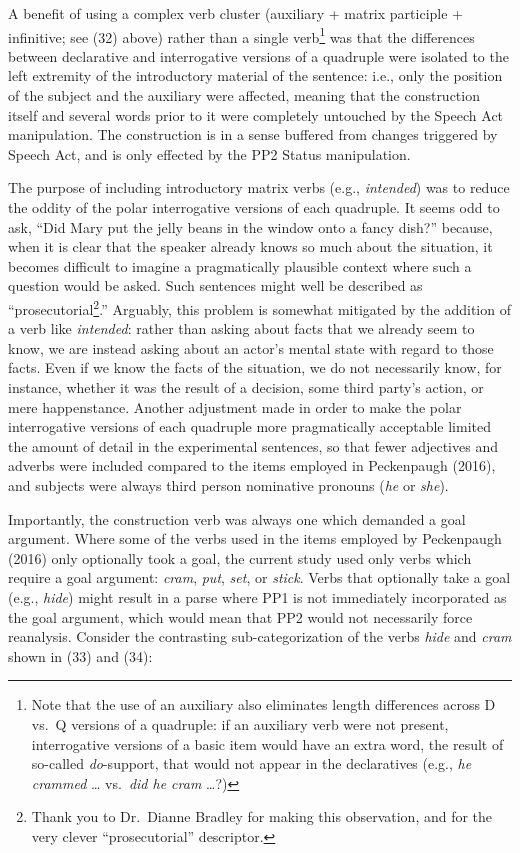 \documentclass[11pt,oneside]{book}
\let\rmarkdownfootnote\footnote%
\def\footnote{\protect\rmarkdownfootnote}
\begin{document}
A benefit of using a complex verb cluster (auxiliary + matrix participle + infinitive; see (32) above) rather than a single verb\footnote{Note that the use of an auxiliary also eliminates length differences across D vs.~Q versions of a quadruple: if an auxiliary verb were not present, interrogative versions of a basic item would have an extra word, the result of so-called \emph{do}-support, that would not appear in the declaratives (e.g., \emph{he crammed} \ldots{} vs.~\emph{did he cram} \ldots?)} was that the differences between declarative and interrogative versions of a quadruple were isolated to the left extremity of the introductory material of the sentence: i.e., only the position of the subject and the auxiliary were affected, meaning that the construction itself and several words prior to it were completely untouched by the Speech Act manipulation. The construction is in a sense buffered from changes triggered by Speech Act, and is only effected by the PP2 Status manipulation.

The purpose of including introductory matrix verbs (e.g., \emph{intended}) was to reduce the oddity of the polar interrogative versions of each quadruple. It seems odd to ask, ``Did Mary put the jelly beans in the window onto a fancy dish?'' because, when it is clear that the speaker already knows so much about the situation, it becomes difficult to imagine a pragmatically plausible context where such a question would be asked. Such sentences might well be described as ``prosecutorial\footnote{Thank you to Dr.~Dianne Bradley for making this observation, and for the very clever ``prosecutorial'' descriptor.}.'' Arguably, this problem is somewhat mitigated by the addition of a verb like \emph{intended}: rather than asking about facts that we already seem to know, we are instead asking about an actor's mental state with regard to those facts. Even if we know the facts of the situation, we do not necessarily know, for instance, whether it was the result of a decision, some third party's action, or mere happenstance. Another adjustment made in order to make the polar interrogative versions of each quadruple more pragmatically acceptable limited the amount of detail in the experimental sentences, so that fewer adjectives and adverbs were included compared to the items employed in Peckenpaugh (2016), and subjects were always third person nominative pronouns (\emph{he} or \emph{she}).

Importantly, the construction verb was always one which demanded a goal argument. Where some of the verbs used in the items employed by Peckenpaugh (2016) only optionally took a goal, the current study used only verbs which require a goal argument: \emph{cram}, \emph{put}, \emph{set}, or \emph{stick}. Verbs that optionally take a goal (e.g., \emph{hide}) might result in a parse where PP1 is not immediately incorporated as the goal argument, which would mean that PP2 would not necessarily force reanalysis. Consider the contrasting sub-categorization of the verbs \emph{hide} and \emph{cram} shown in (33) and (34):
\end{document}
